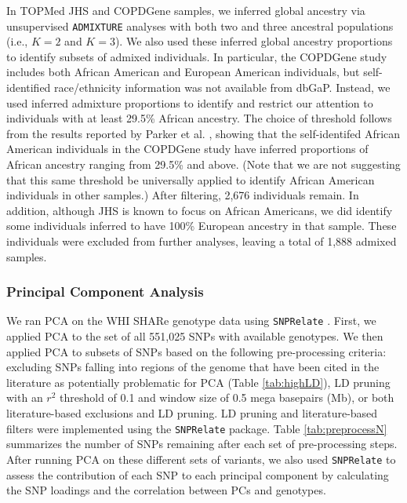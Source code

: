 \documentclass[12pt]{article}
\begin{document}
In TOPMed JHS and COPDGene samples, we inferred global ancestry via unsupervised \texttt{ADMIXTURE} analyses with both two and three ancestral populations (i.e., $K = 2$ and $K = 3$). 
We also used these inferred global ancestry proportions to identify subsets of admixed individuals.
In particular, the COPDGene study includes both African American and European American individuals, but  self-identified race/ethnicity information was not available from dbGaP.
Instead, we used inferred admixture proportions to identify and restrict our attention to individuals with at least 29.5\% African ancestry.
The choice of threshold follows from the results reported by Parker et al. \cite{parker2014}, showing that the self-identifed African American individuals in the COPDGene study have inferred proportions of African ancestry ranging from 29.5\% and above.
(Note that we are not suggesting that this same threshold be universally applied to identify African American individuals in other samples.)
After filtering, 2,676 individuals remain. 
In addition, although JHS is known to focus on African Americans, we did identify some individuals inferred to have 100\% European ancestry in that sample.
These individuals were excluded from further analyses, leaving a total of 1,888 admixed samples. 


\subsubsection{Principal Component Analysis}

We ran PCA on the WHI SHARe genotype data using \texttt{SNPRelate} \citep{snprelate}. 
First, we applied PCA to the set of all 551,025 SNPs with available genotypes.
We then applied PCA to subsets of SNPs based on the following pre-processing criteria: excluding SNPs falling into regions of the genome that have been cited in the literature as potentially problematic for PCA (Table \ref{tab:highLD}), LD pruning with an $r^2$ threshold of 0.1 and window size of 0.5 mega basepairs (Mb), or both literature-based exclusions and LD pruning.
LD pruning and literature-based filters were implemented using the \texttt{SNPRelate} package.
Table \ref{tab:preprocessN} summarizes the number of SNPs remaining after each set of pre-processing steps.
After running PCA on these different sets of variants, we also used \texttt{SNPRelate} to assess the contribution of each SNP to each principal component by calculating the SNP loadings and the correlation between PCs and genotypes.
\end{document}
